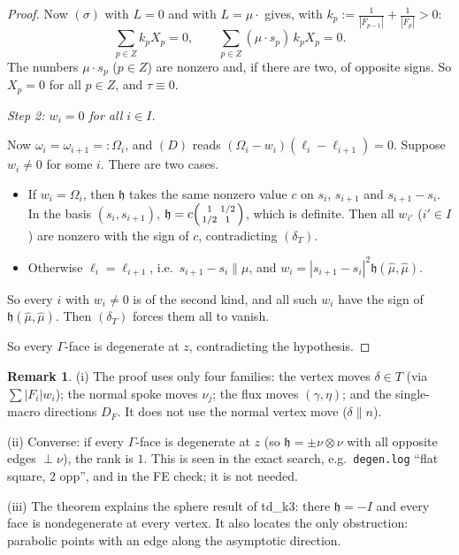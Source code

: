 \documentclass[11pt]{article}
\theoremstyle{definition}
\newtheorem{remark}[theorem]{Remark}
\newcommand{\hh}{\mathfrak h}
\begin{document}
\begin{proof}
Now $(\sigma)$ with $L=0$ and with $L=\mu\cdot$ gives, with $k_p:=\frac1{|F_{p-1}|}+\frac1{|F_p|}>0$:
\[
\textstyle\sum_{p\in Z}k_pX_p=0,\qquad\sum_{p\in Z}(\mu\cdot s_p)\,k_pX_p=0 .
\]
The numbers $\mu\cdot s_p$ ($p\in Z$) are nonzero and, if there are two, of opposite signs. So $X_p=0$ for all $p\in Z$, and $\tau\equiv0$.

\emph{Step 2: $w_i=0$ for all $i\in I$.}

Now $\omega_i=\omega_{i+1}=:\Omega_i$, and $(D)$ reads $(\Omega_i-w_i)(\ell_i-\ell_{i+1})=0$. Suppose $w_i\ne0$ for some $i$. There are two cases.
\begin{itemize}[leftmargin=1.2em]
\item If $w_i=\Omega_i$, then $\hh$ takes the same nonzero value $c$ on $s_i$, $s_{i+1}$ and $s_{i+1}-s_i$. In the basis $(s_i,s_{i+1})$, $\hh=c\begin{psmallmatrix}1&1/2\\1/2&1\end{psmallmatrix}$, which is definite. Then all $w_{i'}$ ($i'\in I$) are nonzero with the sign of $c$, contradicting $(\delta_T)$.
\item Otherwise $\ell_i=\ell_{i+1}$, i.e.\ $s_{i+1}-s_i\parallel\mu$, and $w_i=|s_{i+1}-s_i|^2\hh(\hat\mu,\hat\mu)$.
\end{itemize}
So every $i$ with $w_i\ne0$ is of the second kind, and all such $w_i$ have the sign of $\hh(\hat\mu,\hat\mu)$. Then $(\delta_T)$ forces them all to vanish.

So every $\Gamma$-face is degenerate at $z$, contradicting the hypothesis.
\end{proof}

\begin{remark}
(i) The proof uses only four families: the vertex moves $\delta\in T$ (via $\sum|F_i|w_i$); the normal spoke moves $\nu_j$; the flux moves $(\gamma,\eta)$; and the single-macro directions $D_F$. It does not use the normal vertex move ($\delta\parallel n$).

(ii) Converse: if every $\Gamma$-face is degenerate at $z$ (so $\hh=\pm\nu\otimes\nu$ with all opposite edges $\perp\nu$), the rank is $1$. This is seen in the exact search, e.g.\ \texttt{degen.log} ``flat square, 2 opp'', and in the FE check; it is not needed.

(iii) The theorem explains the sphere result of td\_k3: there $\hh=-I$ and every face is nondegenerate at every vertex. It also locates the only obstruction: parabolic points with an edge along the asymptotic direction.
\end{remark}
\end{document}
